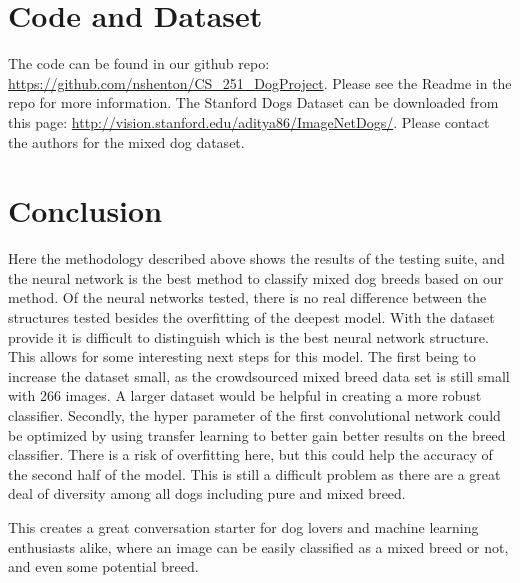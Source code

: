 \documentclass[12pt]{article}
\begin{document}

\section{Code and Dataset}

The code can be found in our github repo: \url{https://github.com/nshenton/CS_251_DogProject}. Please see the Readme in the repo for more information. The Stanford Dogs Dataset can be downloaded from this page: \url{http://vision.stanford.edu/aditya86/ImageNetDogs/}. Please contact the authors for the mixed dog dataset.

\section{Conclusion}

Here the methodology described above shows the results of the testing suite, and the neural network is the best method to classify mixed dog breeds based on our method.  Of the neural networks tested, there is no real difference between the structures tested besides the overfitting of the deepest model.  With the dataset provide it is difficult to distinguish which is the best neural network structure.  This allows for some interesting next steps for this model.   The first being to increase the dataset small, as the crowdsourced mixed breed data set is still small with 266 images.  A larger dataset would be helpful in creating a more robust classifier. Secondly, the hyper parameter of the first convolutional network could be optimized by using transfer learning to better gain better results on the breed classifier.  There is a risk of overfitting here, but this could help the accuracy of the second half of the model.  This is still a difficult problem as there are a great deal of diversity among all dogs including pure and mixed breed.  

This creates a great conversation starter for dog lovers and machine learning enthusiasts alike, where an image can be easily classified as a mixed breed or not, and even some potential breed.


\nocite{*}
{}

\end{document}
